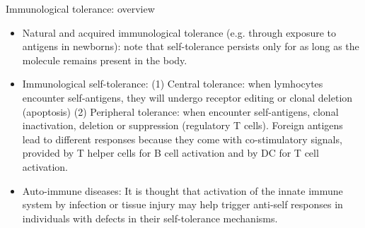 \documentclass{report}
\begin{document}
Immunological tolerance: overview 
\begin{itemize}
	\item Natural and acquired immunological tolerance (e.g. through exposure to antigens in newborns): note that self-tolerance persists only for as long as the molecule remains present in the body. 
	
	\item Immunological self-tolerance: (1) Central tolerance: when lymhocytes encounter self-antigens, they will undergo receptor editing or clonal deletion (apoptosis) (2) Peripheral tolerance: when encounter self-antigens, clonal inactivation, deletion or suppression (regulatory T cells). Foreign antigens lead to different responses because they come with co-stimulatory signals, provided by T helper cells for B cell activation and by DC for T cell activation. 
	
	\item Auto-immune diseases: It is thought that activation of the innate immune system by infection or tissue injury may help trigger anti-self responses in individuals with defects in their self-tolerance mechanisms. 
\end{itemize}
\end{document}
